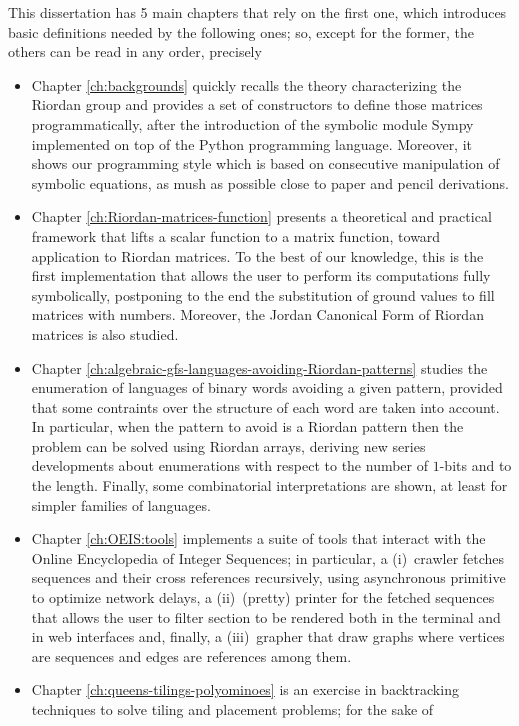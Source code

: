 This dissertation has 5 main chapters that rely on the first one, which
introduces basic definitions needed by the following ones; so, except for the
former, the others can be read in any order, precisely
\begin{itemize}
\item Chapter \ref{ch:backgrounds} quickly recalls the theory characterizing
the Riordan group and provides a set of constructors to define those matrices
programmatically, after the introduction of the symbolic module Sympy
implemented on top of the Python programming language. Moreover, it shows our
programming style which is based on consecutive manipulation of symbolic
equations, as mush as possible close to paper and pencil derivations.
\item Chapter \ref{ch:Riordan-matrices-function} presents a theoretical and
practical framework that lifts a scalar function to a matrix function, toward
application to Riordan matrices. To the best of our knowledge, this is the
first implementation that allows the user to perform its computations fully
symbolically, postponing to the end the substitution of ground values to fill
matrices with numbers. Moreover, the Jordan Canonical Form of Riordan matrices
is also studied.
\item Chapter \ref{ch:algebraic-gfs-languages-avoiding-Riordan-patterns}
studies the enumeration of languages of binary words avoiding a given pattern,
provided that some contraints over the structure of each word are taken into
account.  In particular, when the pattern to avoid is a Riordan pattern then
the problem can be solved using Riordan arrays, deriving new series
developments about enumerations with respect to the number of $1$-bits and to
the length. Finally, some combinatorial interpretations are shown, at least for
simpler families of languages.
\item Chapter \ref{ch:OEIS:tools} implements a suite of tools that interact with
the Online Encyclopedia of Integer Sequences; in particular, a (i)~crawler fetches
sequences and their cross references recursively, using asynchronous primitive
to optimize network delays, a (ii)~(pretty) printer for the fetched sequences that
allows the user to filter section to be rendered both in the terminal and in
web interfaces and, finally, a (iii)~grapher that draw graphs where vertices
are sequences and edges are references among them.
\item Chapter \ref{ch:queens-tilings-polyominoes} is an exercise in
backtracking techniques to solve tiling and placement problems; for the sake of

\end{itemize}
